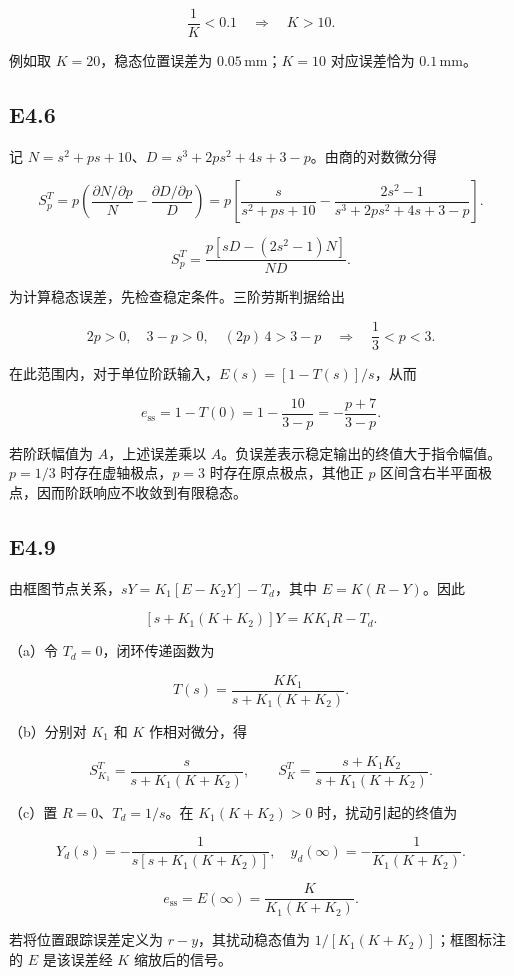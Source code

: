 \documentclass[UTF8,12pt]{ctexart}
\begin{document}
\[
\frac1K<0.1\quad\Longrightarrow\quad\boxed{K>10}.
\]

例如取 $K=20$，稳态位置误差为 $0.05\,\mathrm{mm}$；$K=10$ 对应误差恰为 $0.1\,\mathrm{mm}$。


\subsection*{E4.6}
记 $N=s^2+ps+10$、$D=s^3+2ps^2+4s+3-p$。由商的对数微分得

\[
S_p^T=p\left(\frac{\partial N/\partial p}{N}-\frac{\partial D/\partial p}{D}\right)=p\left[\frac{s}{s^2+ps+10}-\frac{2s^2-1}{s^3+2ps^2+4s+3-p}\right].
\]

\[
\boxed{S_p^T=\frac{p\left[sD-(2s^2-1)N\right]}{ND}}.
\]

为计算稳态误差，先检查稳定条件。三阶劳斯判据给出

\[
2p>0,\quad 3-p>0,\quad (2p)\,4>3-p\quad\Longrightarrow\quad\boxed{\frac13<p<3}.
\]

在此范围内，对于单位阶跃输入，$E(s)=[1-T(s)]/s$，从而

\[
\boxed{e_{\mathrm{ss}}=1-T(0)=1-\frac{10}{3-p}=-\frac{p+7}{3-p}}.
\]

若阶跃幅值为 $A$，上述误差乘以 $A$。负误差表示稳定输出的终值大于指令幅值。$p=1/3$ 时存在虚轴极点，$p=3$ 时存在原点极点，其他正 $p$ 区间含右半平面极点，因而阶跃响应不收敛到有限稳态。


\subsection*{E4.9}
由框图节点关系，$sY=K_1[E-K_2Y]-T_d$，其中 $E=K(R-Y)$。因此

\[
[s+K_1(K+K_2)]Y=KK_1R-T_d.
\]

（a）令 $T_d=0$，闭环传递函数为

\[
\boxed{T(s)=\frac{KK_1}{s+K_1(K+K_2)}}.
\]

（b）分别对 $K_1$ 和 $K$ 作相对微分，得

\[
\boxed{S_{K_1}^T=\frac{s}{s+K_1(K+K_2)}},\qquad\boxed{S_K^T=\frac{s+K_1K_2}{s+K_1(K+K_2)}}.
\]

（c）置 $R=0$、$T_d=1/s$。在 $K_1(K+K_2)>0$ 时，扰动引起的终值为

\[
Y_d(s)=-\frac1{s[s+K_1(K+K_2)]},\quad y_d(\infty)=-\frac1{K_1(K+K_2)}.
\]

\[
\boxed{e_{\mathrm{ss}}=E(\infty)=\frac{K}{K_1(K+K_2)}}.
\]

若将位置跟踪误差定义为 $r-y$，其扰动稳态值为 $1/[K_1(K+K_2)]$；框图标注的 $E$ 是该误差经 $K$ 缩放后的信号。
\end{document}

